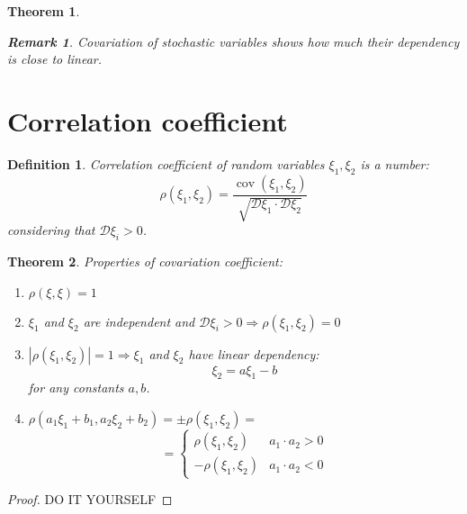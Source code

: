 \documentclass[12pt,letterpaper]{report}
\newtheorem{theorem}{Theorem}
\newtheorem*{remark}{Remark}
\newtheorem{definition}{Definition}
\DeclareMathOperator{\cov}{cov}
\begin{document}
\begin{theorem}
    \begin{remark}
        Covariation of stochastic variables shows how much their dependency is close to linear.
    \end{remark}
\end{theorem}

\section{Correlation coefficient}

\begin{definition}
    Correlation coefficient of random variables $\xi_1, \xi_2$ is a number:
    \[ \rho(\xi_1, \xi_2) = \frac{\cov(\xi_1, \xi_2)}{\sqrt{\mathcal{D}\xi_1 \cdot \mathcal{D}\xi_2}} \]
    considering that $\mathcal{D}\xi_i > 0$.
\end{definition}

\begin{theorem}
    Properties of covariation coefficient:
    \begin{enumerate}
        \item $ \rho(\xi,\xi) = 1 $
        \item $\xi_1$ and $\xi_2$ are independent and $\mathcal{D}\xi_i > 0 \Rightarrow \rho (\xi_1, \xi_2) = 0$ 
        \item $ |\rho(\xi_1, \xi_2)| = 1 \Rightarrow \xi_1$ and $\xi_2$ have linear dependency:
            \[ \xi_2 = a \xi_1 - b \]
            for any constants $a, b$.
        \item $\rho (a_1\xi_1 + b_1, a_2\xi_2 + b_2) = \pm \rho(\xi_1, \xi_2) = $
            \[ = \begin{cases}
                \rho(\xi_1, \xi_2) & a_1 \cdot a_2 > 0 \\
                -\rho(\xi_1, \xi_2) & a_1\cdot a_2 < 0
            \end{cases}\]
    \end{enumerate}
\end{theorem}
\begin{proof}
    DO IT YOURSELF
\end{proof}
\end{document}
